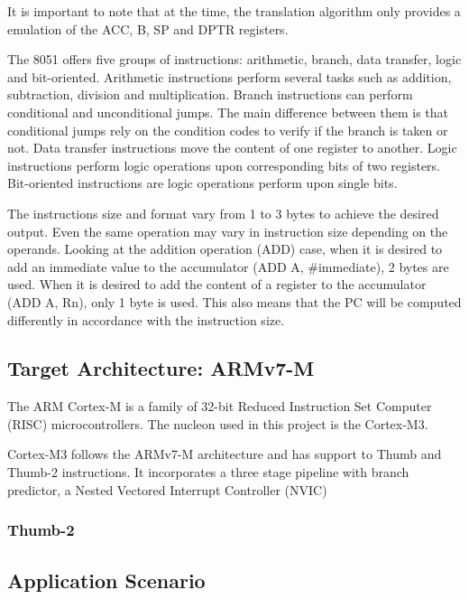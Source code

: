 \documentclass{report}
\begin{document}
		\par It is important to note that at the time, the translation algorithm only provides a emulation of the ACC, B, SP and DPTR registers.
		\par The 8051 offers five groups of instructions: arithmetic, branch, data transfer, logic and bit-oriented. Arithmetic instructions perform several tasks such as addition, subtraction, division and multiplication. Branch instructions can perform conditional and unconditional jumps. The main difference between them is that conditional jumps rely on the condition codes to verify if the branch is taken or not. Data transfer instructions move the content of one register to another. Logic instructions perform logic operations upon corresponding bits of two registers. Bit-oriented instructions are logic operations perform upon single bits\cite{mikroelektronika}.
		\par The instructions size and format vary from 1 to 3 bytes to achieve the desired output. Even the same operation may vary in instruction size depending on the operands. Looking at the addition operation (ADD) case, when it is desired to add an immediate value to the accumulator (ADD A, \#immediate), 2 bytes are used. When it is desired to add the content of a register to the accumulator (ADD A, Rn), only 1 byte is used. This also means that the PC will be computed differently in accordance with the instruction size.
		
		\subsection{Target Architecture: ARMv7-M}
		
		\par The ARM Cortex-M is a family of 32-bit Reduced Instruction Set Computer (RISC) microcontrollers. The nucleon used in this project is the Cortex-M3.
		\par Cortex-M3 follows the ARMv7-M architecture and has support to Thumb and Thumb-2 instructions. It incorporates a three stage pipeline with branch predictor, a Nested Vectored Interrupt Controller (NVIC) 
		
			\subsubsection{Thumb-2}
		
		
		\subsection{Application Scenario}
\end{document}
